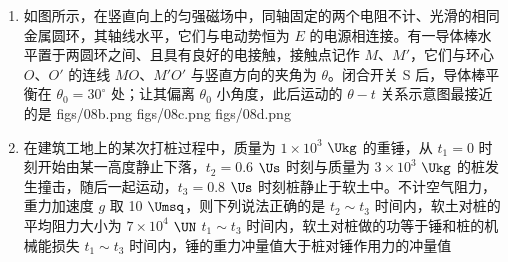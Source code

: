 \documentclass[\gkver]{gaokaozhenti}
\begin{document}
\begin{enumerate}
{整理可得月球质量 $M_{\text{月}}=\frac{WR^{2}}{Gm}$，故 A 正确；

B．月球的第一宇宙速度是近月卫星的环绕速度，满足 $mg_{\text{月}}=m\frac{v_{1}^{2}}{R}$

代入 $g_{\text{月}}=\frac{W}{m}$ 可得 $v_{1}=\sqrt{\frac{WR}{m}}$，故 B 错误；

C．弹簧的劲度系数是弹簧本身的固有属性，由弹簧的材料、匝数、粗细等自身因素决定，和所处的星球环境无关，在地球和月球上劲度系数完全相同，故 C 错误；

D．根据狭义相对论的光速不变原理，任何惯性参考系中测得的真空中光速都为 $c$，不会因为月球的运动发生叠加，故 D 错误。

故选 A。
}

\item
如图所示，在竖直向上的匀强磁场中，同轴固定的两个电阻不计、光滑的相同金属圆环，其轴线水平，它们与电动势恒为 $E$ 的电源相连接。有一导体棒水平置于两圆环之间、且具有良好的电接触，接触点记作 $M$、$M'$，它们与环心 $O$、$O'$ 的连线 $MO$、$M'O'$ 与竖直方向的夹角为 $\theta$。闭合开关 S 后，导体棒平衡在 $\theta_{0}=30^\circ$ 处；让其偏离 $\theta_{0}$ 小角度，此后运动的 $\theta-t$ 关系示意图最接近的是
{figs/08b.png}
{figs/08c.png}
{figs/08d.png}

\item
在建筑工地上的某次打桩过程中，质量为 $1\times10^{3}$ $\Ukg$ 的重锤，从 $t_{1}=0$ 时刻开始由某一高度静止下落，$t_{2}=0.6$ $\Us$ 时刻与质量为 $3\times10^{3}$ $\Ukg$ 的桩发生撞击，随后一起运动，$t_{3}=0.8$ $\Us$ 时刻桩静止于软土中。不计空气阻力，重力加速度 $g$ 取 10 $\Umsq$，则下列说法正确的是
{$t_{2}\sim t_{3}$ 时间内，软土对桩的平均阻力大小为 $7\times10^{4}$ $\UN$}
{$t_{1}\sim t_{3}$ 时间内，软土对桩做的功等于锤和桩的机械能损失}
{$t_{1}\sim t_{3}$ 时间内，锤的重力冲量值大于桩对锤作用力的冲量值}
\end{enumerate}
\end{document}

